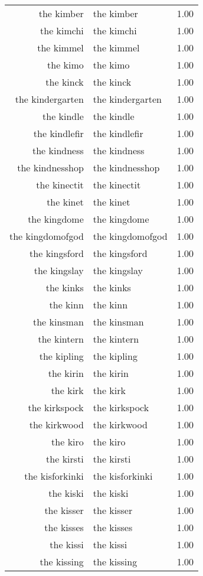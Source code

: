 \begin{table}[ht]
\begin{tabular}{rlr}
  the kimber & the kimber & 1.00 \\ 
  the kimchi & the kimchi & 1.00 \\ 
  the kimmel & the kimmel & 1.00 \\ 
  the kimo & the kimo & 1.00 \\ 
  the kinck & the kinck & 1.00 \\ 
  the kindergarten & the kindergarten & 1.00 \\ 
  the kindle & the kindle & 1.00 \\ 
  the kindlefir & the kindlefir & 1.00 \\ 
  the kindness & the kindness & 1.00 \\ 
  the kindnesshop & the kindnesshop & 1.00 \\ 
  the kinectit & the kinectit & 1.00 \\ 
  the kinet & the kinet & 1.00 \\ 
  the kingdome & the kingdome & 1.00 \\ 
  the kingdomofgod & the kingdomofgod & 1.00 \\ 
  the kingsford & the kingsford & 1.00 \\ 
  the kingslay & the kingslay & 1.00 \\ 
  the kinks & the kinks & 1.00 \\ 
  the kinn & the kinn & 1.00 \\ 
  the kinsman & the kinsman & 1.00 \\ 
  the kintern & the kintern & 1.00 \\ 
  the kipling & the kipling & 1.00 \\ 
  the kirin & the kirin & 1.00 \\ 
  the kirk & the kirk & 1.00 \\ 
  the kirkspock & the kirkspock & 1.00 \\ 
  the kirkwood & the kirkwood & 1.00 \\ 
  the kiro & the kiro & 1.00 \\ 
  the kirsti & the kirsti & 1.00 \\ 
  the kisforkinki & the kisforkinki & 1.00 \\ 
  the kiski & the kiski & 1.00 \\ 
  the kisser & the kisser & 1.00 \\ 
  the kisses & the kisses & 1.00 \\ 
  the kissi & the kissi & 1.00 \\ 
  the kissing & the kissing & 1.00 \\ 

\end{tabular}
\end{table}
